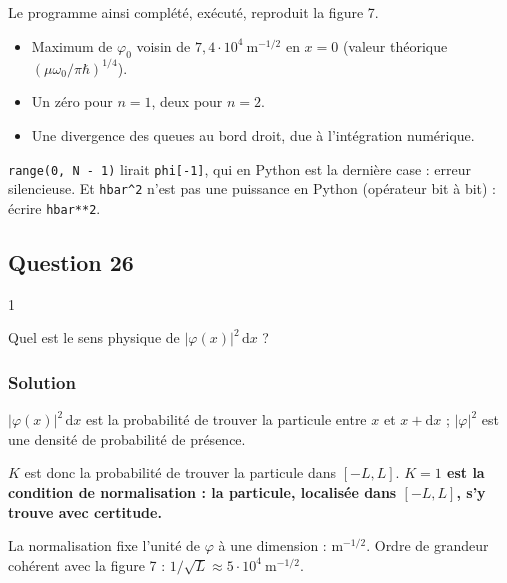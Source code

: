 \documentclass[11pt,a4paper]{article}
\providecommand{\tightlist}{\setlength{\itemsep}{0pt}\setlength{\parskip}{0pt}}
\begin{document}
Le programme ainsi complété, exécuté, reproduit la figure 7.

\begin{itemize}
\tightlist
\item
  Maximum de \(\varphi_0\) voisin de \(7{,}4\cdot10^4\ \mathrm{m^{-1/2}}\) en \(x = 0\) (valeur théorique \((\mu\omega_0/\pi\hbar)^{1/4}\)).
\item
  Un zéro pour \(n = 1\), deux pour \(n = 2\).
\item
  Une divergence des queues au bord droit, due à l'intégration numérique.
\end{itemize}

\begin{piege}

\texttt{range(0,\ N\ -\ 1)} lirait \texttt{phi{[}-1{]}}, qui en Python est la dernière case : erreur silencieuse. Et \texttt{hbar\^{}2} n'est pas une puissance en Python (opérateur bit à bit) : écrire \texttt{hbar**2}.

\end{piege}

\hypertarget{question-26}{%
\subsection{Question 26}\label{question-26}}

\begin{indication}{1}

Quel est le sens physique de \(|\varphi(x)|^2\,\mathrm{d}x\) ?

\end{indication}

\hypertarget{solution-25}{%
\subsubsection{Solution}\label{solution-25}}

\(|\varphi(x)|^2\,\mathrm{d}x\) est la probabilité de trouver la particule entre \(x\) et \(x + \mathrm{d}x\) ; \(|\varphi|^2\) est une densité de probabilité de présence.

\(K\) est donc la probabilité de trouver la particule dans \([-L, L]\). \textbf{\(K = 1\) est la condition de normalisation : la particule, localisée dans \([-L, L]\), s'y trouve avec certitude.}

\begin{methode}

La normalisation fixe l'unité de \(\varphi\) à une dimension : \(\mathrm{m^{-1/2}}\). Ordre de grandeur cohérent avec la figure 7 : \(1/\sqrt{L} \approx 5\cdot10^4\ \mathrm{m^{-1/2}}\).

\end{methode}
\end{document}
